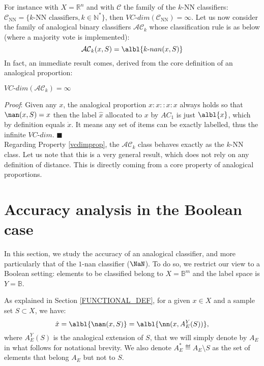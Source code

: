 \documentclass{ecai}
\begin{document}
For instance with $X=\mathbb{R}^n$ and with $\mathcal{C}$ the family of the $k$-NN
classifiers: $\mathcal{C}_{\text{NN}}=\{ k\text{-NN classifiers}, k \in \mathbb{N}^*\}$,
then $VC\mbox{-}dim(\mathcal{C}_{\text{NN}})=\infty$.
Let us now consider the family of analogical binary classifiers $\mathcal{AC}_k$ whose classification rule is as below (where a majority vote is implemented):
$$\mathcal{AC}_k(x,S) = \albl{k\mbox{-}nan(x,S)}$$
In fact, an immediate result comes, derived from the core definition of an analogical proportion:
\begin{proper}\label{vcdimprop}
$VC\mbox{-}dim(\mathcal{AC}_k) = \infty$
\end{proper}
{\it Proof}: Given any $x$, the analogical proportion $x:x::x:x$ always
holds so that $\nan(x,S)=x$ then the label $\hat{x}$ allocated to $x$ by $AC_1$
is just $\albl{x}$, which by definition equals $\dot{x}$. It means any set of items can be
exactly labelled, thus the infinite $VC\mbox{-}dim$.  \hfill $\blacksquare$\\
Regarding Property \ref{vcdimprop}, the $\mathcal{AC}_k$ class
behaves exactly as the $k\mbox{-NN}$ class.
Let us note that this is a very general result, which does not rely on any definition of distance.
This is directly coming from a core property of analogical proportions.

\section{Accuracy analysis in the Boolean case}\label{accuracy}

In this section, we study the accuracy of an analogical classifier, and more
particularly that of the $1$-nan classifier ($\NaN$). To do so, we restrict
our view to a Boolean setting: elements to be classified belong to
$X=\mathbb{B}^m$ and the label space is $Y = \mathbb{B}$.

As explained in Section \ref{FUNCTIONAL_DEF}, for a given $x \in X$ and a sample set
$S \subset X$, we have:
\begin{equation}\label{eq1}
\hat{x}=\albl{\nan(x, S)}=\albl{\nn(x, A_E^Y(S))},
\end{equation}
where $A_E^Y(S)$ is the analogical extension of $S$, that we will simply denote
by $A_E$ in what follows for notational brevity.  We also denote $A_E^*
\eqdef A_E \setminus S$ as the set of elements that belong $A_E$ but not to
$S$.
\end{document}
